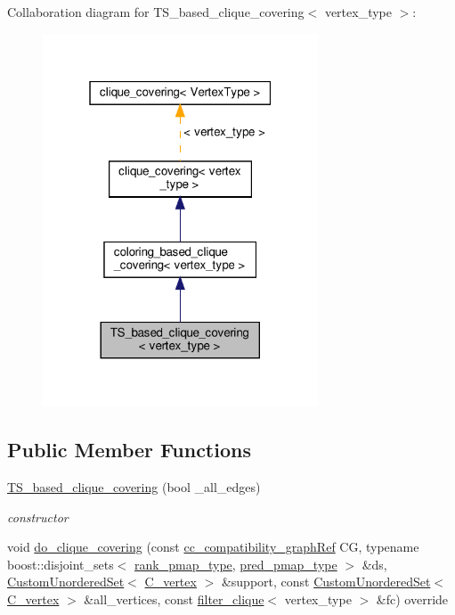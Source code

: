 Collaboration diagram for T\+S\+\_\+based\+\_\+clique\+\_\+covering$<$ vertex\+\_\+type $>$\+:
\nopagebreak
\begin{figure}[H]
\begin{center}
\leavevmode
\includegraphics[width=232pt]{d9/d19/classTS__based__clique__covering__coll__graph}
\end{center}
\end{figure}
\subsection*{Public Member Functions}
\begin{DoxyCompactItemize}
\item 
\hyperlink{classTS__based__clique__covering_af46aedf2e9b0ccf353a6118ac48ce0b9}{T\+S\+\_\+based\+\_\+clique\+\_\+covering} (bool \+\_\+all\+\_\+edges)
\begin{DoxyCompactList}\small\item\em constructor \end{DoxyCompactList}\item 
void \hyperlink{classTS__based__clique__covering_a06e6693964610f2adff388c8b2febe6f}{do\+\_\+clique\+\_\+covering} (const \hyperlink{clique__covering__graph_8hpp_ac7a90ca8b64cfc536aaf17bc81186c18}{cc\+\_\+compatibility\+\_\+graph\+Ref} CG, typename boost\+::disjoint\+\_\+sets$<$ \hyperlink{clique__covering__graph_8hpp_af170aff46b9e4328f1ad9b119cf78b4a}{rank\+\_\+pmap\+\_\+type}, \hyperlink{clique__covering__graph_8hpp_af4c454ac367cfb12e29c98e6bc942a06}{pred\+\_\+pmap\+\_\+type} $>$ \&ds, \hyperlink{classCustomUnorderedSet}{Custom\+Unordered\+Set}$<$ \hyperlink{clique__covering__graph_8hpp_a9cb45047ea8c5ed95a8cfa90494345aa}{C\+\_\+vertex} $>$ \&support, const \hyperlink{classCustomUnorderedSet}{Custom\+Unordered\+Set}$<$ \hyperlink{clique__covering__graph_8hpp_a9cb45047ea8c5ed95a8cfa90494345aa}{C\+\_\+vertex} $>$ \&all\+\_\+vertices, const \hyperlink{structfilter__clique}{filter\+\_\+clique}$<$ vertex\+\_\+type $>$ \&fc) override
\end{DoxyCompactItemize}

